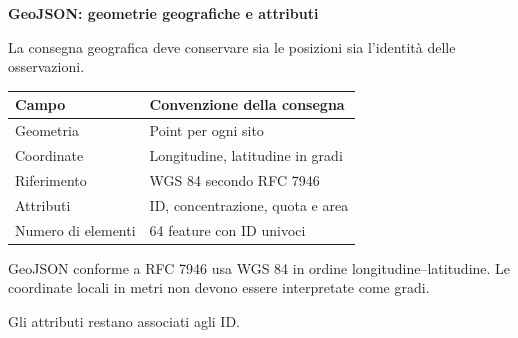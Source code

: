 \documentclass[12pt,aspectratio=1610]{beamer}
\newcommand{\PBody}[1]{\par{\fontsize{11.3}{14.8}\selectfont #1\par}}
\newcommand{\PCode}[2]{%
\begin{tcolorbox}[enhanced,arc=1.8mm,boxrule=.65pt,
  colback=white,colframe=Classical!75!Navy,colbacktitle=Navy,
  coltitle=white,fonttitle=\bfseries\fontsize{9.6}{12}\selectfont,
  title={#1},left=1.7mm,right=1.3mm,top=1.5mm,bottom=1.3mm,
  before skip=1mm,after skip=1mm]

\end{tcolorbox}}
\begin{document}
\begin{frame}[plain]\hypertarget{slide107}{}
\begin{lrbox}{\TitleBox}
\begin{minipage}[t]{17.7cm}\raggedright\color{Ink}\fontsize{11.3}{14.8}\selectfont
\color{Navy}\bfseries\fontsize{20.6}{24.5}\selectfont GeoJSON: geometrie geografiche e attributi
\end{minipage}\end{lrbox}

\begin{lrbox}{\RecallBox}
\begin{minipage}[t]{14.3cm}\raggedright\color{Ink}\fontsize{11.3}{14.8}\selectfont
\fontsize{10.3}{13.8}\selectfont La consegna geografica deve conservare sia le posizioni sia l’identità delle osservazioni.
\end{minipage}\end{lrbox}

\begin{lrbox}{\PilotLeftBox}
\begin{minipage}[t]{10.05cm}\raggedright\color{Ink}\fontsize{11.3}{14.8}\selectfont
{\fontsize{10.2}{13.1}\selectfont\renewcommand{\arraystretch}{1.45}\begin{tabular}{@{}p{3.3cm}p{5.7cm}@{}}\toprule
\textbf{Campo} & \textbf{Convenzione della consegna}\\\midrule
Geometria & Point per ogni sito\\
Coordinate & Longitudine, latitudine in gradi\\
Riferimento & WGS 84 secondo RFC 7946\\
Attributi & ID, concentrazione, quota e area\\
Numero di elementi & 64 feature con ID univoci\\
\bottomrule\end{tabular}}

\end{minipage}\end{lrbox}

\begin{lrbox}{\PilotRightBox}
\begin{minipage}[t]{7.55cm}\raggedright\color{Ink}\fontsize{11.3}{14.8}\selectfont
\PBody{GeoJSON conforme a RFC 7946 usa WGS 84 in ordine longitudine--latitudine. Le coordinate locali in metri non devono essere interpretate come gradi.}
\vspace{2.5mm}
\PBody{Gli attributi restano associati agli ID.}
\vspace{2.5mm}
\PCode{R · scrivere e rileggere GeoJSON}{107_esempio.R}
\end{minipage}\end{lrbox}


\end{frame}
\end{document}

